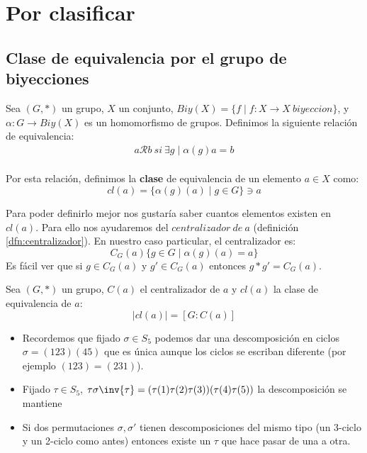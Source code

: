 
\chapter{Por clasificar}

\section{Clase de equivalencia por el grupo de biyecciones}
\begin{dfn}
	Sea $(G, \ast)$ un grupo, $X$ un conjunto, $Biy(X) = \{f\mid f: X\longrightarrow X\ biyeccion\}$, y $\alpha: G \longrightarrow Biy(X)$ es un homomorfismo de grupos. Definimos la siguiente relación de equivalencia:
	\begin{align*}
	a\mathcal{R}b\ si\ \exists g \mid \alpha(g)a=b
	\end{align*}\\
	Por esta relación, definimos la \textbf{clase} de equivalencia de un elemento $a \in X$ como:  \[cl(a)=\{ \alpha(g)(a)\mid g\in G \} \ni a \]
\end{dfn}
Para poder definirlo mejor nos gustaría saber cuantos elementos existen en $cl(a)$. Para ello nos ayudaremos del $centralizador\ de\ a$ (definición \ref{dfn:centralizador}). En nuestro caso particular, el centralizador es:
\[ C_G(a) \{g\in G \mid \alpha(g)(a) = a \} \]
Es fácil ver que si $g \in C_G(a)$ y $g' \in C_G(a)$ entonces $g \ast g' = C_G(a)$.
\begin{thm}
	Sea $(G, \ast)$ un grupo, $C(a)$ el centralizador de $a$ y $cl(a)$ la clase de equivalencia de $a$:
	\[ |cl(a)| = \left[ G:C(a) \right] \]
\end{thm}
\begin{itemize}
	\item Recordemos que fijado $\sigma \in S_5$ podemos dar una descomposición en ciclos $\sigma = (123)(45)$ que es única aunque los ciclos se escriban diferente (por ejemplo $(123) = (231)$).
	
	\item Fijado $\tau \in S_5$, $\tau \sigma \inv{\tau} = (\tau(1)\tau(2)\tau(3))(\tau(4)\tau(5))$ la descomposición se mantiene
	
	\item Si dos permutaciones $\sigma, \sigma'$ tienen descomposiciones del mismo tipo (un 3-ciclo y un 2-ciclo como antes) entonces existe un $\tau$ que hace pasar de una a otra.
\end{itemize}

